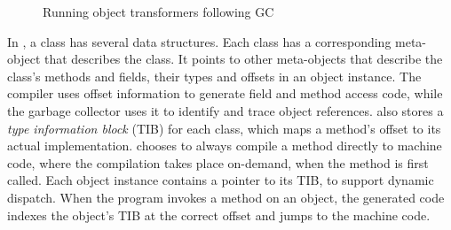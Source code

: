 

\begin{figure}[t]
% 
\begin{center}
% 
\end{center}
\caption{Running object transformers following GC}
\label{fig:gc-example}
\end{figure}

In \JikesRVM{}, a class has several data structures.
Each class has a corresponding \VMClass{} meta-object that describes
the class.  It points to other meta-objects that describe the class's
methods and fields, their types and offsets in an object instance.
The compiler uses offset information to
generate field and method access code, while the garbage collector
uses it to identify and trace object references.  %
\VMClass{} also stores a \emph{type information block} (TIB) for each
class, which maps a method's offset to its actual implementation.
\JikesRVM{} chooses to always compile a method directly to machine code,
where the compilation takes place on-demand, when the method is first
called.  Each object instance
contains a pointer to its TIB, to support dynamic dispatch.  When the
program invokes a method on an object, the generated code
indexes the object's TIB at the correct offset and jumps to the
machine code.

